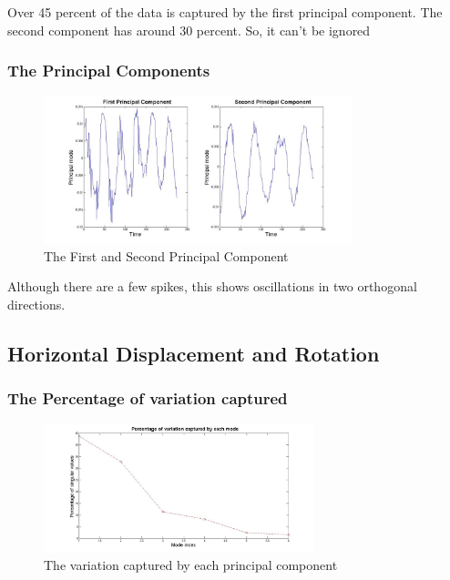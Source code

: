 \documentclass[a4paper]{article}
\begin{document}
Over 45 percent of the data is captured by the first principal component. The second component has around 30 percent. So, it can't be ignored

\subsubsection{The Principal Components}
\begin{figure}[H] 
	\centering
	\includegraphics[width=0.8\textwidth]{PC3.jpg}
	
	\caption{The First and Second Principal Component}	
\end{figure}
Although there are a few spikes, this shows oscillations in two orthogonal directions.

\subsection{Horizontal Displacement and Rotation}







\subsubsection{The Percentage of variation captured}
\begin{figure}[h!] 
	\centering
	\includegraphics[width=0.7\textwidth]{percent4.jpg}
	\caption{The variation captured by each principal component}
\end{figure}
\end{document}

